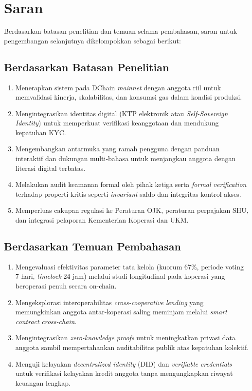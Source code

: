 \section{Saran}

Berdasarkan batasan penelitian dan temuan selama pembahasan, saran untuk pengembangan selanjutnya dikelompokkan sebagai berikut:

\subsection{Berdasarkan Batasan Penelitian}

\begin{enumerate}
	\item Menerapkan sistem pada DChain \textit{mainnet} dengan anggota riil untuk memvalidasi kinerja, skalabilitas, dan konsumsi gas dalam kondisi produksi.

	\item Mengintegrasikan identitas digital (KTP elektronik atau \textit{Self-Sovereign Identity}) untuk memperkuat verifikasi keanggotaan dan mendukung kepatuhan KYC.

	\item Mengembangkan antarmuka yang ramah pengguna dengan panduan interaktif dan dukungan multi-bahasa untuk menjangkau anggota dengan literasi digital terbatas.

	\item Melakukan audit keamanan formal oleh pihak ketiga serta \textit{formal verification} terhadap properti kritis seperti \textit{invariant} saldo dan integritas kontrol akses.

	\item Memperluas cakupan regulasi ke Peraturan OJK, peraturan perpajakan SHU, dan integrasi pelaporan Kementerian Koperasi dan UKM.
\end{enumerate}

\subsection{Berdasarkan Temuan Pembahasan}

\begin{enumerate}
	\item Mengevaluasi efektivitas parameter tata kelola (kuorum 67\%, periode voting 7 hari, \textit{timelock} 24 jam) melalui studi longitudinal pada koperasi yang beroperasi penuh secara on-chain.

	\item Mengeksplorasi interoperabilitas \textit{cross-cooperative lending} yang memungkinkan anggota antar-koperasi saling meminjam melalui \textit{smart contract} \textit{cross-chain}.

	\item Mengintegrasikan \textit{zero-knowledge proofs} untuk meningkatkan privasi data anggota sambil mempertahankan auditabilitas publik atas kepatuhan kolektif.

	\item Menguji kelayakan \textit{decentralized identity} (DID) dan \textit{verifiable credentials} untuk verifikasi kelayakan kredit anggota tanpa mengungkapkan riwayat keuangan lengkap.
\end{enumerate}
